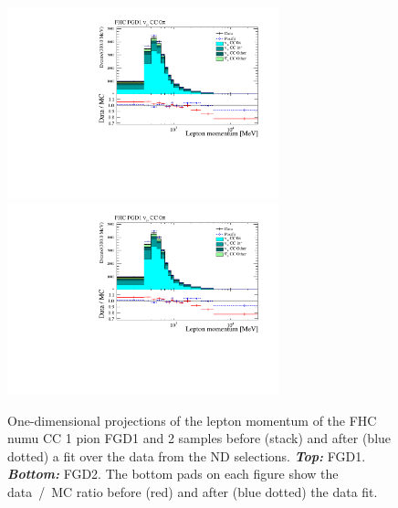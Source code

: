 \begin{figure}[ht]
  \center
  \includegraphics[keepaspectratio=true,width=0.7\textwidth,page=2]{images/BANFF/reactionCodeStacks_PrefitAndPostfit_mom.pdf}\\
  \includegraphics[keepaspectratio=true,width=0.7\textwidth,page=5]{images/BANFF/reactionCodeStacks_PrefitAndPostfit_mom.pdf}\\
  \begin{center}
    \caption[FHC $\nu_\mu$ CC 1 pion FGD1 and 2 samples before and
    after a fit over the data from the ND280
    selections]{One-dimensional projections of the lepton momentum of
      the \Gls{FHC} \Gls{numu} \Gls{CC} 1 pion \Gls{FGD}1 and 2
      samples before (stack) and after (blue dotted) a fit over the
      data from the \Gls{ND} selections. \textbf{\textit{Top:}}
      \Gls{FGD}1. \textbf{\textit{Bottom:}} \Gls{FGD}2. The bottom
      pads on each figure show the data~/~\Gls{MC} ratio before (red)
      and after (blue dotted) the data fit.}
    \label{fig:numuCC1Pi}
  \end{center}
\end{figure}


